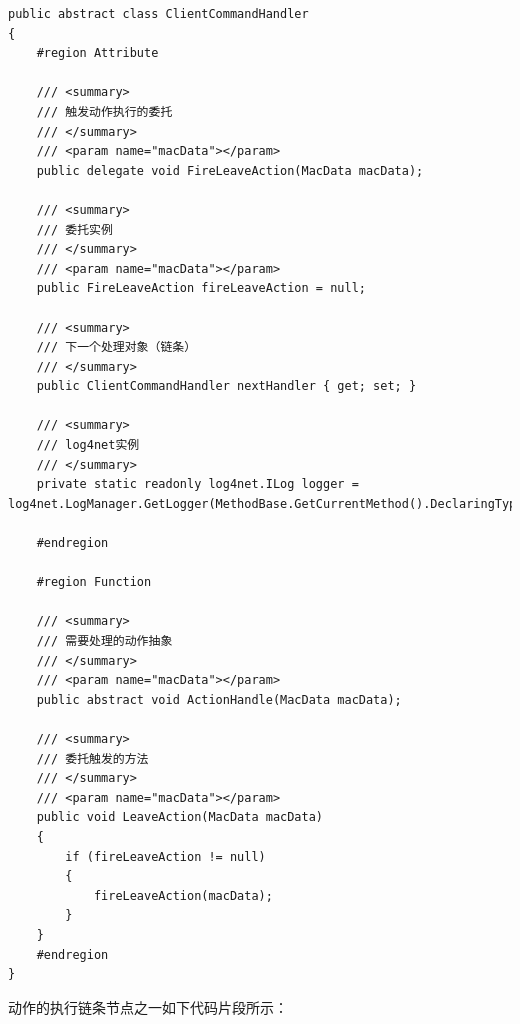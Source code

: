 \documentclass{book}
\begin{document}
\begin{lstlisting}
public abstract class ClientCommandHandler
{
	#region Attribute

	/// <summary>
	/// 触发动作执行的委托
	/// </summary>
	/// <param name="macData"></param>
	public delegate void FireLeaveAction(MacData macData);
	
	/// <summary>
	/// 委托实例
	/// </summary>
	/// <param name="macData"></param>
	public FireLeaveAction fireLeaveAction = null;
	
	/// <summary>
	/// 下一个处理对象（链条）
	/// </summary>
	public ClientCommandHandler nextHandler { get; set; }
	
	/// <summary>
	/// log4net实例
	/// </summary>
	private static readonly log4net.ILog logger = log4net.LogManager.GetLogger(MethodBase.GetCurrentMethod().DeclaringType);
	
	#endregion
	
	#region Function
	
	/// <summary>
	/// 需要处理的动作抽象
	/// </summary>
	/// <param name="macData"></param>
	public abstract void ActionHandle(MacData macData);
	
	/// <summary>
	/// 委托触发的方法
	/// </summary>
	/// <param name="macData"></param>
	public void LeaveAction(MacData macData)
	{
	    if (fireLeaveAction != null)
	    {
	        fireLeaveAction(macData);
	    }
	}
	#endregion
}
\end{lstlisting}

动作的执行链条节点之一如下代码片段所示：
\end{document}
